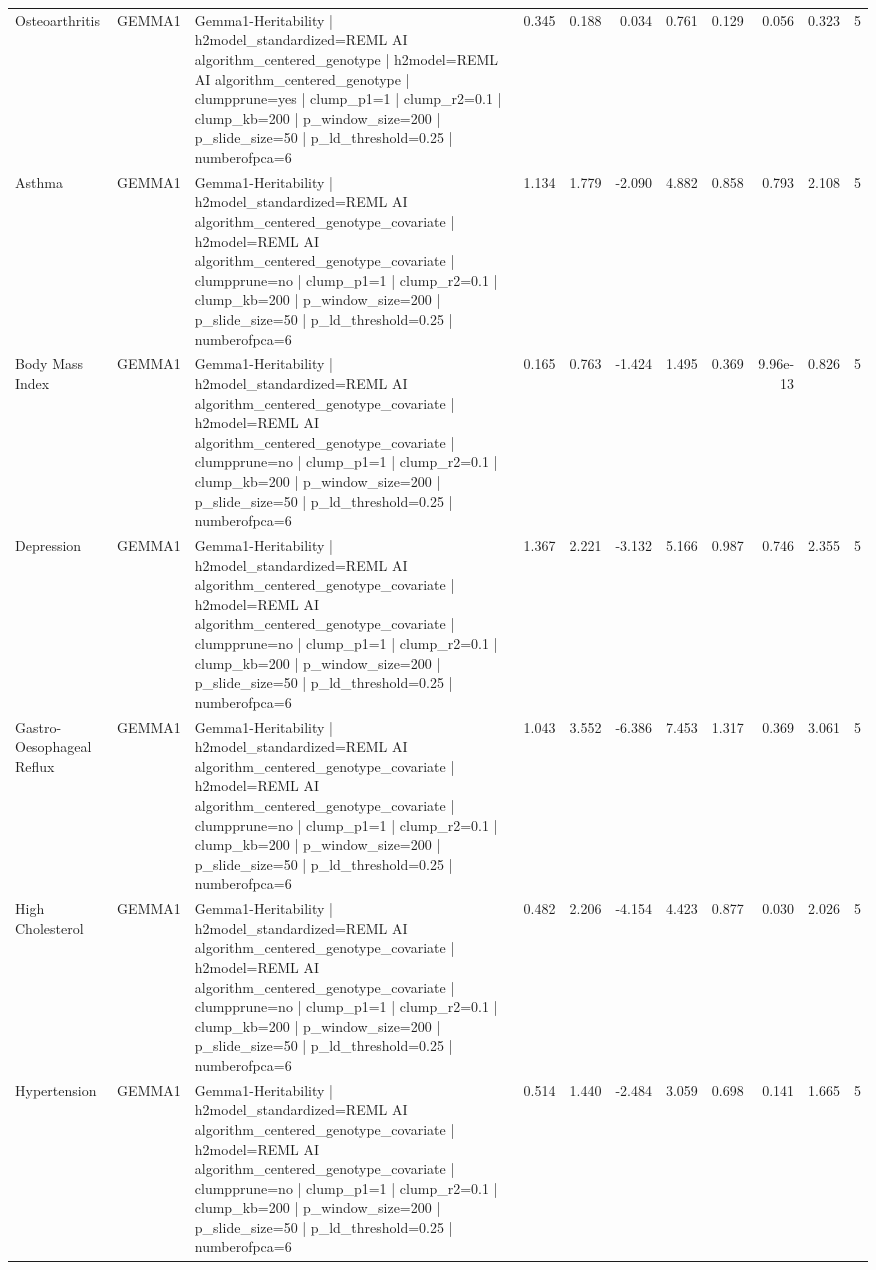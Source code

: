 \begin{landscape}
\begin{longtable}{p{2.4cm}p{1.8cm}p{6.0cm}rrrrrrrr}
Osteoarthritis & GEMMA1 & Gemma1-Heritability | h2model\_standardized=REML AI algorithm\_centered\_genotype | h2model=REML AI algorithm\_centered\_genotype | clumpprune=yes | clump\_p1=1 | clump\_r2=0.1 | clump\_kb=200 | p\_window\_size=200 | p\_slide\_size=50 | p\_ld\_threshold=0.25 | numberofpca=6 & 0.345 & 0.188 & 0.034 & 0.761 & 0.129 & 0.056 & 0.323 & 5 \\
Asthma & GEMMA1 & Gemma1-Heritability | h2model\_standardized=REML AI algorithm\_centered\_genotype\_covariate | h2model=REML AI algorithm\_centered\_genotype\_covariate | clumpprune=no | clump\_p1=1 | clump\_r2=0.1 | clump\_kb=200 | p\_window\_size=200 | p\_slide\_size=50 | p\_ld\_threshold=0.25 | numberofpca=6 & 1.134 & 1.779 & -2.090 & 4.882 & 0.858 & 0.793 & 2.108 & 5 \\
Body Mass Index & GEMMA1 & Gemma1-Heritability | h2model\_standardized=REML AI algorithm\_centered\_genotype\_covariate | h2model=REML AI algorithm\_centered\_genotype\_covariate | clumpprune=no | clump\_p1=1 | clump\_r2=0.1 | clump\_kb=200 | p\_window\_size=200 | p\_slide\_size=50 | p\_ld\_threshold=0.25 | numberofpca=6 & 0.165 & 0.763 & -1.424 & 1.495 & 0.369 & 9.96e-13 & 0.826 & 5 \\
Depression & GEMMA1 & Gemma1-Heritability | h2model\_standardized=REML AI algorithm\_centered\_genotype\_covariate | h2model=REML AI algorithm\_centered\_genotype\_covariate | clumpprune=no | clump\_p1=1 | clump\_r2=0.1 | clump\_kb=200 | p\_window\_size=200 | p\_slide\_size=50 | p\_ld\_threshold=0.25 | numberofpca=6 & 1.367 & 2.221 & -3.132 & 5.166 & 0.987 & 0.746 & 2.355 & 5 \\
Gastro-Oesophageal Reflux & GEMMA1 & Gemma1-Heritability | h2model\_standardized=REML AI algorithm\_centered\_genotype\_covariate | h2model=REML AI algorithm\_centered\_genotype\_covariate | clumpprune=no | clump\_p1=1 | clump\_r2=0.1 | clump\_kb=200 | p\_window\_size=200 | p\_slide\_size=50 | p\_ld\_threshold=0.25 | numberofpca=6 & 1.043 & 3.552 & -6.386 & 7.453 & 1.317 & 0.369 & 3.061 & 5 \\
High Cholesterol & GEMMA1 & Gemma1-Heritability | h2model\_standardized=REML AI algorithm\_centered\_genotype\_covariate | h2model=REML AI algorithm\_centered\_genotype\_covariate | clumpprune=no | clump\_p1=1 | clump\_r2=0.1 | clump\_kb=200 | p\_window\_size=200 | p\_slide\_size=50 | p\_ld\_threshold=0.25 | numberofpca=6 & 0.482 & 2.206 & -4.154 & 4.423 & 0.877 & 0.030 & 2.026 & 5 \\
Hypertension & GEMMA1 & Gemma1-Heritability | h2model\_standardized=REML AI algorithm\_centered\_genotype\_covariate | h2model=REML AI algorithm\_centered\_genotype\_covariate | clumpprune=no | clump\_p1=1 | clump\_r2=0.1 | clump\_kb=200 | p\_window\_size=200 | p\_slide\_size=50 | p\_ld\_threshold=0.25 | numberofpca=6 & 0.514 & 1.440 & -2.484 & 3.059 & 0.698 & 0.141 & 1.665 & 5 \\

\end{longtable}
\end{landscape}
